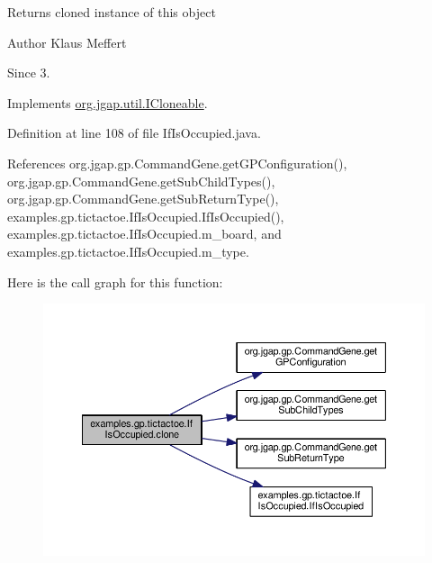 \begin{DoxyReturn}{Returns}
cloned instance of this object
\end{DoxyReturn}
\begin{DoxyAuthor}{Author}
Klaus Meffert 
\end{DoxyAuthor}
\begin{DoxySince}{Since}
3. 
\end{DoxySince}


Implements \hyperlink{interfaceorg_1_1jgap_1_1util_1_1_i_cloneable_aa7e7d62077e6428ad7904932b1b4f7d5}{org.\-jgap.\-util.\-I\-Cloneable}.



Definition at line 108 of file If\-Is\-Occupied.\-java.



References org.\-jgap.\-gp.\-Command\-Gene.\-get\-G\-P\-Configuration(), org.\-jgap.\-gp.\-Command\-Gene.\-get\-Sub\-Child\-Types(), org.\-jgap.\-gp.\-Command\-Gene.\-get\-Sub\-Return\-Type(), examples.\-gp.\-tictactoe.\-If\-Is\-Occupied.\-If\-Is\-Occupied(), examples.\-gp.\-tictactoe.\-If\-Is\-Occupied.\-m\-\_\-board, and examples.\-gp.\-tictactoe.\-If\-Is\-Occupied.\-m\-\_\-type.



Here is the call graph for this function\-:
\nopagebreak
\begin{figure}[H]
\begin{center}
\leavevmode
\includegraphics[width=350pt]{classexamples_1_1gp_1_1tictactoe_1_1_if_is_occupied_ada71b10d97d3fe99b917865900918998_cgraph}
\end{center}
\end{figure}


